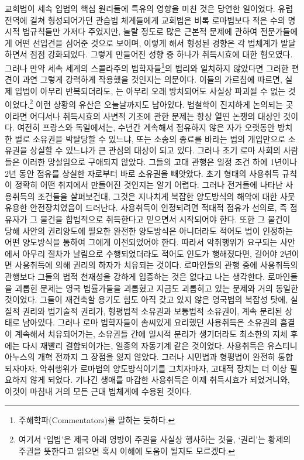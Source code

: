 교회법이 세속 입법의
핵심 원리들에 특유의 영향을 미친 것은 당연한 일이었다.
유럽 전역에 걸쳐 형성되어가던 관습법 체계들에게 교회법은
비록 로마법보다 적은 수의 명시적 법규칙들만 가져다 주었지만,
놀랄 정도로 많은 근본적 문제에 관하여
전문가들에게 어떤 선입견을 심어준 것으로 보이며,
이렇게 해서 형성된 경향은 각 법체계가 발달하면서 점점 강화되었다.
그렇게 만들어진 성향 중 하나가 취득시효에 대한 혐오였다.
그러나 만약
세속 세계의
스콜라주의 법학자들\footnote{%
  주해학파(Commentators)를 말하는 듯하다.
}의
법리와 일치하지 않았다면
그러한 편견이
과연 그렇게 강력하게 작용했을 것인지는 의문이다.
이들의 가르침에 따르면,
실제 입법이 아무리 반복되더라도,
는 아무리 오래 방치되어도
사실상 파괴될 수 없는 것이었다.\footnote{%
  여기서 `입법'은 제국 아래 영방이 주권을 사실상 행사하는 것을,
  `권리'는 황제의 주권을 뜻한다고 읽으면 혹시 이해에 도움이 될지도 모르겠다.
  }
이런 상황의 유산은 오늘날까지도 남아있다.
법철학이 진지하게 논의되는 곳이라면 어디서나
취득시효의 사변적 기초에 관한 문제는 항상 열띤 논쟁의 대상인 것이다.
여전히 프랑스와 독일에서는,
수년간 계속해서 점유하지 않은 자가
오랫동안 방치한 벌로
소유권을 박탈당할 수 있느냐,
또는 소송의 종료를 바라는 법의 개입만으로
소유권을 상실할 수 있느냐가
큰 관심의 대상이 되고 있다.
그러나 초기 로마 사회의 사람들은 이러한 망설임으로 구애되지 않았다.
그들의 고대 관행은
일정 조건 하에 1년이나 2년 동안 점유를 상실한 자로부터
바로 소유권을 빼앗았다.
초기 형태의 사용취득 규칙이 정확히 어떤 취지에서 만들어진 것인지는
알기 어렵다.
그러나 전거들에 나타난 사용취득의 조건들을 살펴보건대,
그것은 지나치게 복잡한 양도방식의 해악에 대한 사뭇 유용한 안전장치였음이
드러난다.
사용취득이 인정되려면
적대적 점유가 선의로,
즉 점유자가 그 물건을 합법적으로 취득한다고 믿으면서
시작되어야 한다.
또한 그 물건이
당해 사안의 권리양도에 필요한 완전한 양도방식은 아니더라도
적어도 법이 인정하는
어떤 양도방식을 통하여 그에게 이전되었어야 한다.
따라서 악취행위가 요구되는 사안에서
아무리 절차가 날림으로 수행되었더라도
적어도 인도가 행해졌다면,
길어야 2년이면 사용취득에 의해 권리의 하자가 치유되는 것이다.
로마인들의 관행 중에 사용취득의 관행보다
그들의 법적 천재성을 강하게 입증하는 것은 없다고 나는 생각한다.
로마인들을 괴롭힌 문제는 영국 법률가들을 괴롭혔고
지금도 괴롭히고 있는 문제와 거의 동일한 것이었다.
그들이 재건축할 용기도 힘도 아직 갖고 있지 않은
영국법의 복잡성 탓에,
실질적 권리와 법기술적 권리가,
형평법적 소유권과 보통법적 소유권이,
계속 분리된 상태로 남아있다.
그러나 로마 법학자들이 솜씨있게 요리했던 사용취득은
소유권의 흠결이 계속해서 치유되어가는,
소유권들 간에 일시적 분리가 생기더라도
최소한의 지체 후에는 다시 재빨리 결합되어가는,
일종의 자동기계 같은 것이었다.
사용취득은 유스티니아누스의 개혁 전까지
그 장점을 잃지 않았다.
그러나 시민법과 형평법이 완전히 통합되자마자,
악취행위가 로마법의 양도방식이기를 그치자마자,
고대적 장치는 더 이상 필요하지 않게 되었다.
기나긴 생애를 마감한
사용취득은
이제
취득시효가 되었거니와,
이것이 마침내 거의 모든 근대 법체계에 수용된 것이다.

